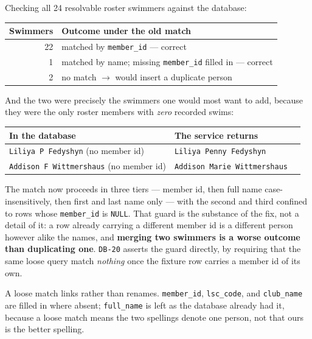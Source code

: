 \documentclass[11pt]{article}
\newcommand{\code}[1]{\texttt{#1}}
\newcommand{\req}[1]{\texttt{#1}}
\begin{document}
Checking all 24 resolvable roster swimmers against the database:

\begin{center}
\begin{tabular}{rl}
\toprule
\textbf{Swimmers} & \textbf{Outcome under the old match} \\
\midrule
22 & matched by \code{member\_id} --- correct \\
1  & matched by name; missing \code{member\_id} filled in --- correct \\
\textcolor{bad}{2} & \textcolor{bad}{no match $\rightarrow$ would insert a duplicate person} \\
\bottomrule
\end{tabular}
\end{center}

\noindent And the two were precisely the swimmers one would most want
to add, because they were the only roster members with \emph{zero}
recorded swims:

\begin{center}
\begin{tabular}{lll}
\toprule
\textbf{In the database} & \textbf{The service returns} \\
\midrule
\code{Liliya P Fedyshyn} (no member id)      & \code{Liliya Penny Fedyshyn} \\
\code{Addison F Wittmershaus} (no member id) & \code{Addison Marie Wittmershaus} \\
\bottomrule
\end{tabular}
\end{center}

The match now proceeds in three tiers --- member id, then full name
case-insensitively, then first and last name only --- with the second
and third confined to rows whose \code{member\_id} is \code{NULL}.
That guard is the substance of the fix, not a detail of it: a row
already carrying a different member id is a different person however
alike the names, and \textbf{merging two swimmers is a worse outcome
than duplicating one}.  \req{DB-20} asserts the guard directly, by
requiring that the same loose query match \emph{nothing} once the
fixture row carries a member id of its own.

A loose match links rather than renames.  \code{member\_id},
\code{lsc\_code}, and \code{club\_name} are filled in where absent;
\code{full\_name} is left as the database already had it, because a
loose match means the two spellings denote one person, not that ours is
the better spelling.
\end{document}
